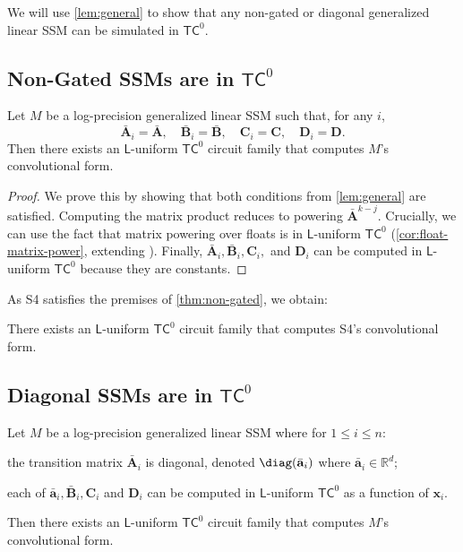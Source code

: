 We will use \ref{lem:general} to show that any non-gated or diagonal generalized linear SSM can be simulated in $\mathsf{TC}^0$.

\subsection{Non-Gated SSMs are in $\mathsf{TC}^0$} \label{sec:non-gated}

\begin{theorem} \label{thm:non-gated}
    Let $M$ be a log-precision generalized linear SSM such that, for any $i$,
    \begin{equation*}
        \bar{\mathbf A}_i = \bar{\mathbf A}, \quad
        \bar{\mathbf B}_i = \bar{\mathbf B}, \quad \mathbf C_i = \mathbf C, \quad \mathbf D_i = \mathbf D .
    \end{equation*}
    Then there exists an $\mathsf{L}$-uniform $\mathsf{TC}^0$ circuit family that computes $M$'s convolutional form.
\end{theorem}

\begin{proof}
    We prove this by showing that both conditions from \ref{lem:general} are satisfied. Computing the matrix product reduces to powering $\bar{\mathbf A}^{k - j}$. Crucially, we can use the fact that matrix powering over floats is in $\mathsf{L}$-uniform $\mathsf{TC}^0$ (\ref{cor:float-matrix-power}, extending \citealp{mereghetti2000threshold}).
    Finally, $\bar{\mathbf A}_i, \bar{\mathbf B}_i, \mathbf C_i,$ and $\mathbf D_i$ can be computed in $\mathsf{L}$-uniform $\mathsf{TC}^0$ because they are constants.

\end{proof}

As S4 satisfies the premises of \ref{thm:non-gated}, we obtain:

\begin{corollary} \label{cor:s4}
    There exists an $\mathsf{L}$-uniform $\mathsf{TC}^0$ circuit family that computes S4's convolutional form.
\end{corollary}

\subsection{Diagonal SSMs are in $\mathsf{TC}^0$} \label{sec:diagonal}

\begin{theorem} \label{thm:diagonal}
Let $M$ be a log-precision generalized linear SSM where for $1 \leq i \leq n$:
\begin{compactenum}
    \item the transition matrix $\bar{\mathbf A}_i$ is diagonal, denoted $\diag(\bar{\mathbf{a}}_i)$ where $\bar{\mathbf a}_i \in \mathbb R^d$;
    \item each of $\bar{\mathbf a}_i, \bar{\mathbf B}_i, \mathbf C_i$ and $\mathbf D_i$ can be computed in $\mathsf{L}$-uniform $\mathsf{TC}^0$ as a function of $\mathbf x_i$.
\end{compactenum}
Then there exists an $\mathsf{L}$-uniform $\mathsf{TC}^0$ circuit family that computes $M$'s convolutional form.
\end{theorem}


